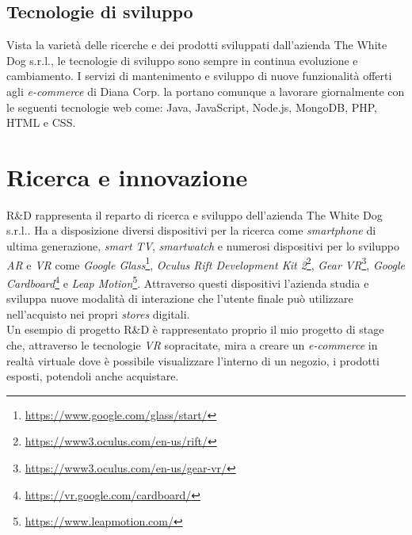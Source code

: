 \subsection{Tecnologie di sviluppo}

Vista la varietà delle ricerche e dei prodotti sviluppati dall'azienda The White Dog s.r.l., le tecnologie di sviluppo sono sempre in continua evoluzione e cambiamento. I servizi di mantenimento e sviluppo di nuove funzionalità offerti agli \textit{e-commerce} di Diana Corp. la portano  comunque a lavorare giornalmente con le seguenti tecnologie web come: Java, JavaScript, Node.js, MongoDB, PHP, HTML e CSS.

\section{Ricerca e innovazione}

R\&D rappresenta il reparto di ricerca e sviluppo dell'azienda The White Dog s.r.l..
Ha a disposizione diversi dispositivi per la ricerca come \textit{smartphone} di ultima generazione, \textit{smart TV}, \textit{smartwatch} e numerosi dispositivi per lo sviluppo \textit{AR} e \textit{VR} come \textit{Google Glass}\footnote[9]{\url{https://www.google.com/glass/start/}}, \textit{Oculus Rift Development Kit 2}\footnote[10]{\url{https://www3.oculus.com/en-us/rift/}}, \textit{Gear VR}\footnote[11]{\url{https://www3.oculus.com/en-us/gear-vr/}}, \textit{Google Cardboard}\footnote[12]{\url{https://vr.google.com/cardboard/}} e \textit{Leap Motion}\footnote[13]{\url{https://www.leapmotion.com/}}. Attraverso questi dispositivi l'azienda studia e sviluppa nuove modalità di interazione che l'utente finale può utilizzare nell'acquisto nei propri \textit{stores} digitali. \\
Un esempio di progetto R\&D è rappresentato proprio il mio progetto di stage che, attraverso le tecnologie \textit{VR} sopracitate, mira a creare un \textit{e-commerce} in realtà virtuale dove è possibile visualizzare l'interno di un negozio, i prodotti esposti, potendoli anche acquistare.
